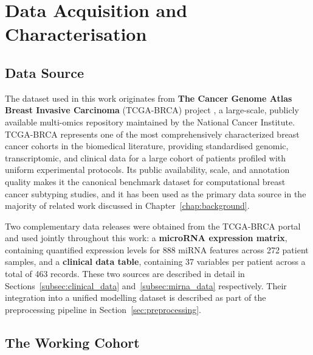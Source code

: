 \section{Data Acquisition and Characterisation}
\label{sec:data_acquisition}

\subsection{Data Source}
\label{subsec:data_source}

The dataset used in this work originates from \textbf{The Cancer Genome Atlas
Breast Invasive Carcinoma} (TCGA-BRCA) project \cite{TCGA_BRCA}, a large-scale, publicly available
multi-omics repository maintained by the National Cancer Institute. TCGA-BRCA
represents one of the most comprehensively characterized breast cancer cohorts in
the biomedical literature, providing standardised genomic, transcriptomic, and
clinical data for a large cohort of patients profiled with uniform experimental
protocols. Its public availability, scale, and annotation quality makes it the
canonical benchmark dataset for computational breast cancer subtyping studies,
and it has been used as the primary data source in the majority of related work
discussed in Chapter~\ref{chap:background}.

Two complementary data releases were obtained from the TCGA-BRCA portal and
used jointly throughout this work: a \textbf{microRNA expression matrix},
containing quantified expression levels for 888 miRNA features across 272
patient samples, and a \textbf{clinical data table}, containing 37 variables per
patient across a total of 463 records. These two sources are described in detail
in Sections~\ref{subsec:clinical_data} and~\ref{subsec:mirna_data} respectively.
Their integration into a unified modelling dataset is described as part of the
preprocessing pipeline in Section~\ref{sec:preprocessing}.

\subsection{The Working Cohort}
\label{subsec:working_cohort}

